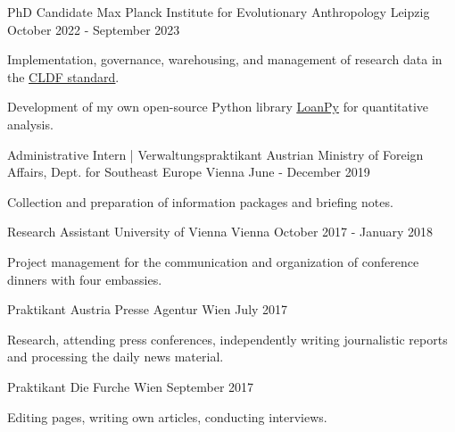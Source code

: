 \begin{cventries}

  \cventry
    {PhD Candidate} %
    {Max Planck Institute for Evolutionary Anthropology} %
    {Leipzig} %
    {October 2022 - September 2023} %
    {
      \begin{cvitems} %
      \item{Implementation, governance, warehousing, and management of research data in the \underline{\href{https://cldf.clld.org/}{CLDF standard}}.}
      \item{Development of my own open-source Python library \underline{\href{https://pypi.org/project/loanpy/}{LoanPy}} for quantitative analysis.}
      \end{cvitems}
    }
    
  \cventry
    {Administrative Intern | Verwaltungspraktikant} %
    {Austrian Ministry of Foreign Affairs, Dept. for Southeast Europe} %
    {Vienna} %
    {June - December 2019} %
    {
      \begin{cvitems} %
        \item{Collection and preparation of information packages and briefing notes.}
      \end{cvitems}
    }

  \cventry
    {Research Assistant} %
    {University of Vienna} %
    {Vienna} %
    {October 2017 - January 2018} %
    {
    \begin{cvitems}
    \item{Project management for the communication and organization of conference dinners with four embassies.}
    \end{cvitems}
    }

  \cventry
    {Praktikant} %
    {Austria Presse Agentur} %
    {Wien} %
    {July 2017} %
    {
    \begin{cvitems}
    \item{Research, attending press conferences, independently writing journalistic reports and processing the daily news material.}
    \end{cvitems}
    }


  \cventry
    {Praktikant} %
    {Die Furche} %
    {Wien} %
    {September 2017} %
    {
    \begin{cvitems}
    \item{Editing pages, writing own articles, conducting interviews.}
    \end{cvitems}
    }
       

\end{cventries}
